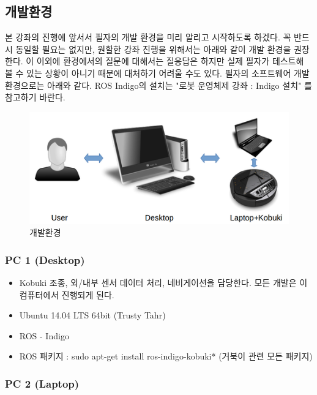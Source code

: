 \subsection{개발환경}

본 강좌의 진행에 앞서서 필자의 개발 환경을 미리 알리고 시작하도록 하겠다. 꼭 반드시 동일할 필요는 없지만, 원할한 강좌 진행을 위해서는 아래와 같이 개발 환경을 권장한다. 이 이외에 환경에서의 질문에 대해서는 질응답은 하지만 실제 필자가 테스트해 볼 수 있는 상황이 아니기 때문에 대처하기 어려울 수도 있다. 필자의 소프트웨어 개발환경으로는 아래와 같다. ROS Indigo의 설치는 "로봇 운영체제 강좌 : Indigo 설치" 를 참고하기 바란다.

\begin{figure}[h]
\centering\includegraphics[width=0.8\columnwidth]{pictures/chapter10/develop_environment.png}
\caption{개발환경}
\end{figure}

\subsubsection{PC 1 (Desktop)}

\begin{itemize}[leftmargin=*]
\item Kobuki 조종, 외/내부 센서 데이터 처리, 네비게이션을 담당한다. 모든 개발은 이 컴퓨터에서 진행되게 된다.
\item Ubuntu 14.04 LTS 64bit (Trusty Tahr)
\item ROS - Indigo
\item ROS 패키지 : sudo apt-get install ros-indigo-kobuki* (거북이 관련 모든 패키지)
\end{itemize}

\subsubsection{PC 2 (Laptop)}

